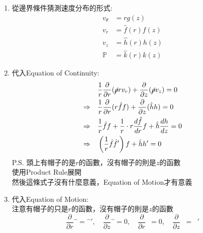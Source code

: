 \documentclass[../main.tex]{subfiles}
\begin{document}
\begin{itemize}
\begin{enumerate}
\begin{itemize}
      \begin{equation}
        v_r(r,0) = 0, \quad v_\theta(r,0) = \omega r, \quad v_z(r,0) = 0
      \end{equation}
      \item 於$z\to\infty$處，流體垂直往下流動:
      \begin{equation}
        v_r(r,\infty) = 0, \quad v_\theta(r,\infty) = 0, \quad v_z(r,\infty) = -U
      \end{equation}
    \end{itemize}
    \item 從邊界條件猜測速度分布的形式:
    \begin{align}
      v_\theta &= r g(z) \\
      v_r &= \hat f(r) f(z)\\
      v_z &= \hat h(r) h(z)\\
      \mathbb{P} &= \hat k(r) k(z)
    \end{align}
    \item 代入Equation of Continuity:
    \begin{align}
      & \frac{1}{r}\frac{\partial }{\partial r}(\cancel{\rho} r v_r) + \frac{\partial}{\partial z}(\cancel{\rho} v_z) = 0 \nonumber\\
      \Rightarrow \quad & \frac{1}{r}\frac{\partial }{\partial r}(r\hat f f)
      + \frac{\partial }{\partial z}(\hat h h) = 0 \nonumber\\
      \Rightarrow \quad & \frac{1}{r}\hat f f +\frac{1}{r}\cdot r \frac{d\hat f}{dr} f + \hat h \frac{dh}{dz} = 0 \nonumber\\
      \Rightarrow \quad & \left(\frac{1}{r}\hat f  \hat f' \right) f + \hat h h' = 0 \label{eq:ch2_3_flow_to_a_rotating_disk_continuity}
    \end{align}
    P.S. 頭上有帽子的是$r$的函數，沒有帽子的則是$z$的函數\\
    使用Product Rule展開\\
    然後這條式子沒有什麼意義，Equation of Motion才有意義
    \item 代入Equation of Motion:\\
    注意有帽子的只是$r$的函數，沒有帽子的則是$z$的函數
    \begin{equation}
      \frac{\partial}{\partial r} \hat{\boxed{\phantom{a}}} = \hat{\boxed{\phantom{a}}}' , \quad
      \frac{\partial}{\partial z} \hat{\boxed{\phantom{a}}} = 0, \quad
      \frac{\partial}{\partial r} \boxed{\phantom{a}} = 0 , \quad
      \frac{\partial}{\partial z} \boxed{\phantom{a}} = \boxed{\phantom{a}}'

\end{equation}
\end{enumerate}
\end{itemize}
\end{document}
